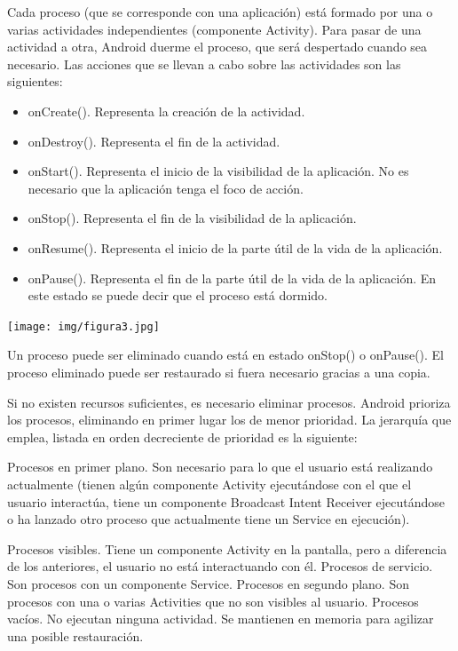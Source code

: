 \documentclass[12 pt, a4paper, twoside]{article}
\begin{document}
Cada proceso (que se corresponde con una aplicación) está formado por una o varias
actividades independientes (componente Activity). Para pasar de una actividad
a otra, Android duerme el proceso, que será despertado cuando sea necesario. Las
acciones que se llevan a cabo sobre las actividades son las
siguientes:
\begin{itemize}
\item onCreate(). Representa la creación de la actividad.
\item onDestroy(). Representa el fin de la actividad.
\item onStart(). Representa el inicio de la visibilidad de la
  aplicación. No es necesario que la aplicación tenga el foco de acción.
\item onStop(). Representa el fin de la visibilidad de la aplicación.
\item onResume(). Representa el inicio de la parte útil de la vida de la aplicación.
\item onPause(). Representa el fin de la parte útil de la vida de la aplicación. En
este estado se puede decir que el proceso está dormido.
\end{itemize}
\begin{center}
  \texttt{[image: img/figura3.jpg]}
\end{center}

Un proceso puede ser eliminado cuando está en estado onStop() o onPause().
El proceso eliminado puede ser restaurado si fuera necesario gracias a una copia.

Si no existen recursos suficientes, es necesario eliminar procesos. Android prioriza
los procesos, eliminando en primer lugar los de menor prioridad. La jerarquía que
emplea, listada en orden decreciente de prioridad es la siguiente:

Procesos en primer plano. Son necesario para lo que el usuario está realizando
actualmente (tienen algún componente Activity ejecutándose con
el que el usuario interactúa, tiene un componente Broadcast Intent
Receiver ejecutándose o ha lanzado otro proceso que actualmente tiene un
Service en ejecución).

Procesos visibles. Tiene un componente Activity en la pantalla, pero a
diferencia de los anteriores, el usuario no está interactuando con él.
Procesos de servicio. Son procesos con un componente Service.
Procesos en segundo plano. Son procesos con una o varias Activities
que no son visibles al usuario.
Procesos vacíos. No ejecutan ninguna actividad. Se mantienen en memoria
para agilizar una posible restauración.
\end{document}
